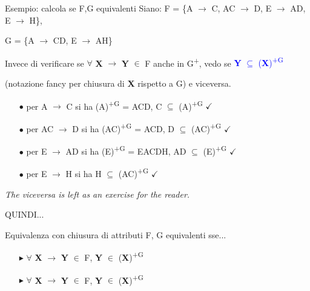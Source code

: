 \documentclass{beamer}
\begin{document}
\begin{frame}{Esempio: calcola se F,G equivalenti}
Siano: F = \{A $\rightarrow$ C, AC $\rightarrow$ D, E $\rightarrow$ AD, E $\rightarrow$ H\},\par
\hspace{1cm} G = \{A $\rightarrow$ CD, E $\rightarrow$ AH\}

\begin{block}{}
    Invece di verificare se $\forall$ \textbf{X} $\rightarrow$ \textbf{Y} $\in$ F anche in G\textsuperscript{+}, vedo se \textcolor{blue}{\textbf{Y} $\subseteq$ (\textbf{X})\textsuperscript{+G}}\par (notazione fancy per chiusura di \textbf{X} rispetto a G) e viceversa.
\end{block}

\begin{itemize}
    \item[$\bullet$] per A $\rightarrow$ C si ha (A)\textsuperscript{+G} = ACD, C $\subseteq$ (A)\textsuperscript{+G} $\checkmark$
    \item[$\bullet$] per AC $\rightarrow$ D si ha (AC)\textsuperscript{+G} = ACD, D $\subseteq$ (AC)\textsuperscript{+G} $\checkmark$
    \item[$\bullet$] per E $\rightarrow$ AD si ha (E)\textsuperscript{+G} = EACDH, AD $\subseteq$ (E)\textsuperscript{+G} $\checkmark$
    \item[$\bullet$] per E $\rightarrow$ H si ha H $\subseteq$ (AC)\textsuperscript{+G} $\checkmark$
\end{itemize}
\textit{The viceversa is left as an exercise for the reader.}\par
\Huge\centering QUINDI...
\end{frame}

\begin{frame}{Equivalenza con chiusura di attributi}
    \huge
    F, G equivalenti sse...
    \begin{itemize}
        \centering
        \item[$\blacktriangleright$] $\forall$ \textbf{X} $\rightarrow$ \textbf{Y} $\in$ F, \textbf{Y} $\in$ (\textbf{X})\textsuperscript{+G}
        \item[$\blacktriangleright$] $\forall$ \textbf{X} $\rightarrow$ \textbf{Y} $\in$ F, \textbf{Y} $\in$ (\textbf{X})\textsuperscript{+G}
    \end{itemize}
\end{frame}
\end{document}
